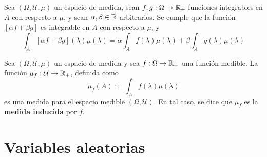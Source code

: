 \begin{proposicion}
Sea $(\Omega, \mathcal{U}, \mu)$ un espacio de medida, sean $f,g:\Omega \rightarrow \mathbb{R}_+$ funciones integrables en $A$ con respecto a $\mu$, y sean $\alpha, \beta \in \mathbb{R}$ arbitrarios. 
%
Se cumple que la función $[\alpha f + \beta g]$ es integrable en $A$ con respecto a $\mu$, y
\begin{equation}
\int_A \left[ \alpha f + \beta g \right] (\lambda) \mu(\lambda) = \alpha \int_A f(\lambda) \mu(\lambda) + \beta \int_A g(\lambda) \mu(\lambda)
\end{equation}
\end{proposicion}

\begin{proposicion}
Sea $(\Omega, \mathcal{U}, \mu)$ un espacio de medida y sea $f:\Omega \rightarrow \mathbb{R}_+$ una función medible. La función $\mu_f:\mathcal{U}\rightarrow\mathbb{R}_+$, definida como
\begin{equation}
\mu_f(A) := \int_A f(\lambda) \mu(\lambda)
\end{equation}
es una medida para el espacio medible $(\Omega, \mathcal{U})$. En tal caso, se dice que $\mu_f$ es la \textbf{medida inducida} por $f$.
\end{proposicion}



\section{Variables aleatorias}

